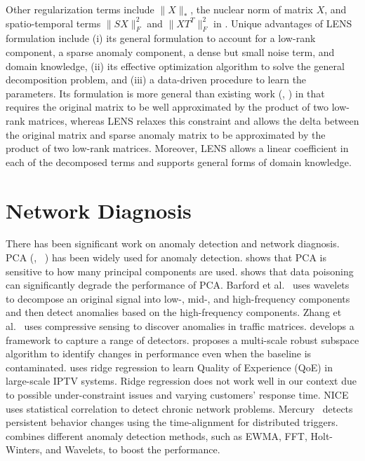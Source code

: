 Other regularization terms include $\|X\|_*$, the nuclear norm of
matrix $X$, and spatio-temporal terms $\|SX\|_F^2$ and $\|XT^T\|_F^2$
in \cite{zhang09sensing}. Unique advantages of LENS formulation
include (i) its
general formulation to account for a low-rank component, a sparse anomaly
component, a dense but small noise
term, and domain knowledge, (ii) its effective optimization
algorithm to solve the general decomposition problem, and (iii) a
data-driven procedure to learn the parameters. Its formulation is more
general than existing work (\eg, \cite{zhang09sensing}) in that
\cite{zhang09sensing} requires the original matrix to be well approximated by
  the product of two low-rank matrices, whereas LENS relaxes this
  constraint and allows the delta between the original matrix and
  sparse anomaly matrix to be approximated by the product of two
  low-rank matrices. Moreover, LENS allows a linear
  coefficient in each of the decomposed terms and supports general
  forms of domain knowledge.


\section{Network Diagnosis}
\label{sec:rel_diagnosis}

There has been significant work on anomaly detection and network
diagnosis. PCA (\eg, ~\cite{PCA1,PCA2,PCA3}) has been widely used for anomaly
detection. \cite{PCA-sensitivity} shows that PCA is sensitive to how
many principal components are used. \cite{PCA-data-poison} shows that
data poisoning can significantly degrade the performance of PCA.
Barford et al.~\cite{barford-wavelet} uses wavelets to decompose
an original signal into low-, mid-, and high-frequency
components and then detect anomalies based on the high-frequency
components. Zhang et al.~\cite{zhang09sensing} uses
compressive sensing to discover anomalies in traffic matrices.
\cite{anomography} develops a framework to capture a
range of detectors. 
\cite{PRISM} proposes a multi-scale robust subspace algorithm to
identify changes in performance even when the baseline is
contaminated.  \cite{Q-score} uses ridge regression to learn Quality of
Experience (QoE) in large-scale IPTV systems. Ridge regression does
not work well in our context due to possible under-constraint
issues and varying customers' response time. 
NICE~\cite{NICE} uses
statistical correlation to detect chronic network
problems. Mercury~\cite{Mercury} detects persistent behavior changes
using the time-alignment for distributed
triggers.
\cite{anomaly-icdcs11} combines different anomaly
detection methods, such as EWMA, FFT, Holt-Winters, and Wavelets, to boost
the performance. 

